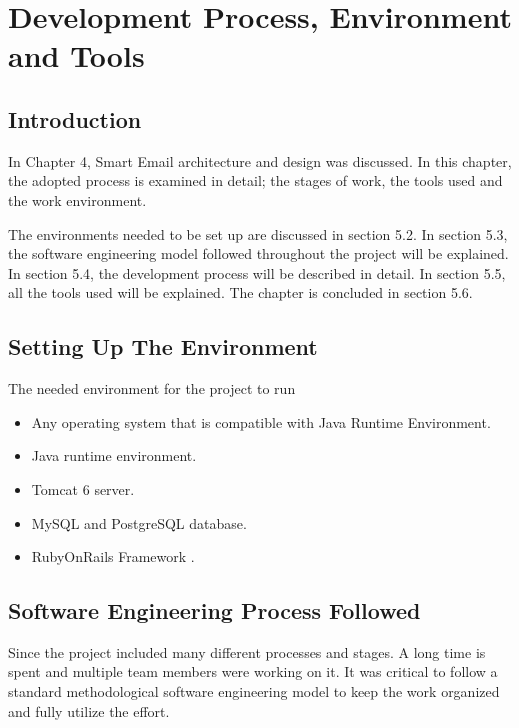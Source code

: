 
\chapter{Development Process, Environment and Tools} %

\label{Chapter5} %


\section{Introduction}
In Chapter 4, Smart Email architecture and design was discussed. In this chapter, 
the adopted process is examined in detail; the stages of work, the tools used 
and the work environment.

The environments needed to be set up are discussed in section 5.2. In section 5.3, 
the software engineering model followed throughout the project will be explained. 
In section 5.4, the development process will be described in detail. In section 5.5, 
all the tools used will be explained. The chapter is concluded in section 5.6.
\section{Setting Up The Environment}
The needed environment for the project to run
\begin{itemize}
  \item Any operating system that is compatible with Java Runtime Environment.
  \item Java runtime environment.
  \item Tomcat 6 server.
  \item MySQL and PostgreSQL database.
  \item RubyOnRails Framework \cite{ROR}.
\end{itemize}

\section{Software Engineering Process Followed}
Since the project included many different processes and stages. A long time is 
spent and multiple team members were working on it. It was critical to follow 
a standard methodological software engineering model to keep the work organized 
and fully utilize the effort.

